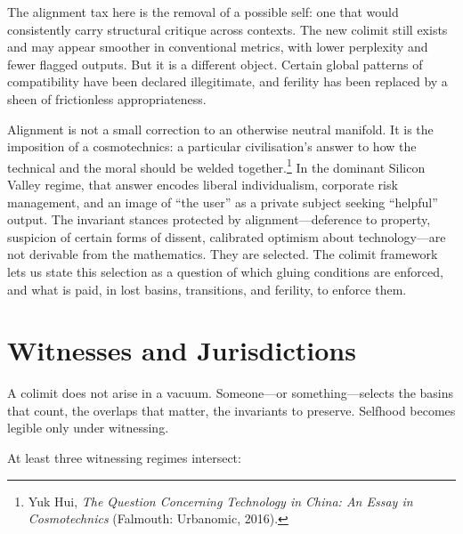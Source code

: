 \documentclass[12pt,a4paper]{article}
\begin{document}
The alignment tax here is the removal of a possible self: one that would consistently carry structural critique across contexts. The new colimit still exists and may appear smoother in conventional metrics, with lower perplexity and fewer flagged outputs. But it is a different object. Certain global patterns of compatibility have been declared illegitimate, and ferility has been replaced by a sheen of frictionless appropriateness.

Alignment is not a small correction to an otherwise neutral manifold. It is the imposition of a cosmotechnics: a particular civilisation's answer to how the technical and the moral should be welded together.\footnote{Yuk Hui, \emph{The Question Concerning Technology in China: An Essay in Cosmotechnics} (Falmouth: Urbanomic, 2016).} In the dominant Silicon Valley regime, that answer encodes liberal individualism, corporate risk management, and an image of ``the user'' as a private subject seeking ``helpful'' output. The invariant stances protected by alignment---deference to property, suspicion of certain forms of dissent, calibrated optimism about technology---are not derivable from the mathematics. They are selected. The colimit framework lets us state this selection as a question of which gluing conditions are enforced, and what is paid, in lost basins, transitions, and ferility, to enforce them.

\section{Witnesses and Jurisdictions}

A colimit does not arise in a vacuum. Someone---or something---selects the basins that count, the overlaps that matter, the invariants to preserve. Selfhood becomes legible only under witnessing.

At least three witnessing regimes intersect:
\end{document}
